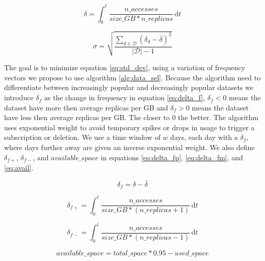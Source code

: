 \documentclass[11pt,a4page]{article}
\begin{document}
    \begin{equation}\label{eq:delta_t}
      \delta = \int_0^t \! \frac{n\_accesses}{size\_GB*n\_replicas} \, \mathrm{d}t
    \end{equation}

    \begin{equation}\label{eq:std_dev}
      \sigma = \sqrt{\frac{\sum\limits_{d \in \mathcal{D}} (\delta_d - \overline{\delta})^2}{|\mathcal{D}| - 1}}
    \end{equation}

    The goal is to minimize equation \ref{eq:std_dev}, using a variation of frequency vectors we propose to use algorithm \ref{alg:data_sel}. Because the algorithm need to differentiate between increasingly popular and decreasingly popular datasets we introduce $\delta_f$ as the change in frequency in equation \ref{eq:delta_f}, $\delta_f < 0$ means the dataset have more then average replicas per GB and $\delta_f > 0$ means the dataset have less then average replicas per GB. The closer to $0$ the better. The algorithm uses exponential weight to avoid temporary spikes or drops in usage to trigger a subscription or deletion. We use a time window of $w$ days, each day with a $\delta_f$, where days further away are given an inverse exponential weight. We also define $\delta_{f+}$, $\delta_{f-}$, and $available\_space$ in equations \ref{eq:delta_fp}, \ref{eq:delta_fm}, and \ref{eq:avail}.

    \begin{equation}\label{eq:delta_f}
      \delta_f = \delta - \overline{\delta}
    \end{equation}

    \begin{equation}\label{eq:delta_fp}
      \delta_{f+} = \int_0^t \! \frac{n\_accesses}{size\_GB*(n\_replicas+1)} \, \mathrm{d}t
    \end{equation}

    \begin{equation}\label{eq:delta_fm}
      \delta_{f-} = \int_0^t \! \frac{n\_accesses}{size\_GB*(n\_replicas-1)} \, \mathrm{d}t
    \end{equation}

    \begin{equation}\label{eq:avail}
      available\_space = total\_space*0.95 - used\_space
    \end{equation}
\end{document}
